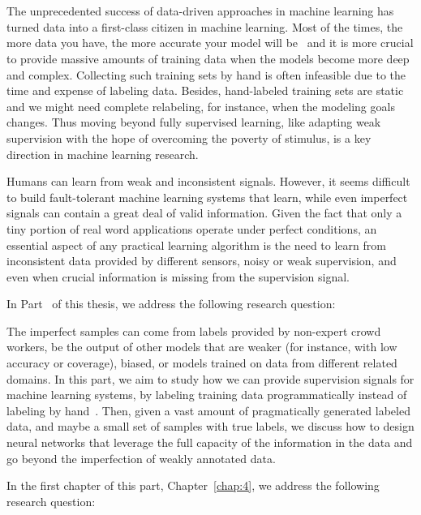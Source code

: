 \part{} %
\label{part2}
The unprecedented success of data-driven approaches in machine learning has turned data into a first-class citizen in machine learning. Most of the times, the more data you have, the more accurate your model will be~\citep{halevy2009unreasonable,sun2017revisiting} and it is more crucial to provide massive amounts of training data when the models become more deep and complex.
Collecting such training sets by hand is often infeasible due to the time and expense of labeling data. Besides, hand-labeled training sets are static and we might need complete relabeling, for instance, when the modeling goals changes. Thus moving beyond fully supervised learning, like adapting weak supervision with the hope of overcoming the poverty of stimulus, is a key direction in machine learning research.

Humans can learn from weak and inconsistent signals\citep{chomsky1980rules}. However, it seems difficult to build fault-tolerant machine learning systems that learn, while even imperfect signals can contain a great deal of valid information.
Given the fact that only a tiny portion of real word applications operate under perfect conditions, an essential aspect of any practical learning algorithm is the need to learn from inconsistent data provided by different sensors, noisy or weak supervision, and even when crucial information is missing from the supervision signal.

In Part~\ref{part2} of this thesis, we address the following research question:

The imperfect samples can come from labels provided by non-expert crowd workers, be the output of other models that are weaker (for instance, with low accuracy or coverage), biased, or models trained on data from different related domains. 
In this part, we aim to study how we can provide supervision signals for machine learning systems, by labeling training data programmatically instead of labeling by hand~\citep{Ratner:2016}. Then, given a vast amount of pragmatically generated labeled data, and maybe a small set of samples with true labels,  we discuss how to design neural networks that leverage the full capacity of the information in the data and go beyond the imperfection of weakly annotated data.


In the first chapter of this part, Chapter~\ref{chap:4}, we address the following research question:

